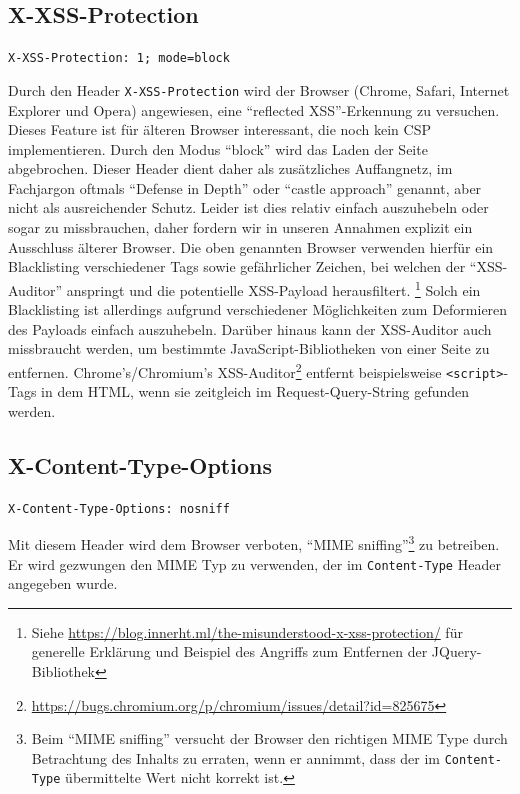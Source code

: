 \documentclass[12pt,DIV14,BCOR10mm,a4paper,parskip=half-,headsepline,headinclude,english,ngerman,bibliography=totocnumbered]{scrreprt}
\begin{document}
\subsection{X-XSS-Protection}
\label{x:xss:protection}
\begin{sloppypar}
\texttt{X-XSS-Protection: 1; mode=block}
\end{sloppypar}
Durch den Header \texttt{X-XSS-Protection} wird der Browser (Chrome, Safari, Internet Explorer und Opera) angewiesen, eine \enquote{reflected XSS}-Erkennung zu versuchen.
Dieses Feature ist für älteren Browser interessant, die noch kein CSP implementieren.
Durch den Modus \enquote{block} wird das Laden der Seite abgebrochen.
Dieser Header dient daher als zusätzliches Auffangnetz, im Fachjargon oftmals \enquote{Defense in Depth} oder \enquote{castle approach} genannt, aber nicht als ausreichender Schutz.
Leider ist dies relativ einfach auszuhebeln oder sogar zu missbrauchen, daher fordern wir in unseren Annahmen explizit ein Ausschluss älterer Browser.
Die oben genannten Browser verwenden hierfür ein Blacklisting verschiedener Tags sowie gefährlicher Zeichen, bei welchen der \enquote{XSS-Auditor} anspringt und die potentielle XSS-Payload herausfiltert.
\footnote{Siehe \url{https://blog.innerht.ml/the-misunderstood-x-xss-protection/} für generelle Erklärung und Beispiel des Angriffs zum Entfernen der JQuery-Bibliothek}
Solch ein Blacklisting ist allerdings aufgrund verschiedener Möglichkeiten zum Deformieren des Payloads einfach auszuhebeln.
Darüber hinaus kann der XSS-Auditor auch missbraucht werden, um bestimmte JavaScript-Bibliotheken von einer Seite zu entfernen.
Chrome's/Chromium's XSS-Auditor\footnote{\url{https://bugs.chromium.org/p/chromium/issues/detail?id=825675}} entfernt beispielsweise \texttt{<script>}-Tags in dem HTML, wenn sie zeitgleich im Request-Query-String gefunden werden.

\subsection{X-Content-Type-Options}
\begin{sloppypar}
\texttt{X-Content-Type-Options: nosniff}
\end{sloppypar}
Mit diesem Header wird dem Browser verboten, \enquote{MIME sniffing}\footnote{Beim \enquote{MIME sniffing} versucht der Browser den richtigen MIME Type durch Betrachtung des Inhalts zu erraten, wenn er annimmt, dass der im \texttt{Content-Type} übermittelte Wert nicht korrekt ist.} zu betreiben. Er wird gezwungen den MIME Typ zu verwenden, der im \texttt{Content-Type} Header angegeben wurde.
\end{document}
